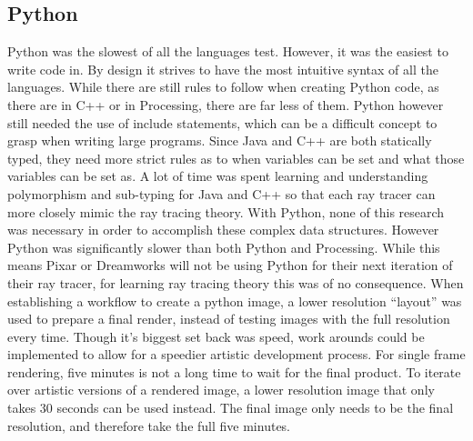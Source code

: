 \subsection{Python}
Python was the slowest of all the languages test.  However, it was the easiest to write code in.  By design it strives to have the most intuitive syntax of all the languages.  While there are still rules to follow when creating Python code, as there are in C++ or in Processing, there are far less of them.  Python however still needed the use of include statements, which can be a difficult concept to grasp when writing large programs. Since Java and C++ are both statically typed, they need more strict rules as to when variables can be set and what those variables can be set as.  A lot of time was spent learning and understanding polymorphism and sub-typing for Java and C++ so that each ray tracer can more closely mimic the ray tracing theory.  With Python, none of this research was necessary in order to accomplish these complex data structures.  However Python was significantly slower than both Python and Processing.  While this means Pixar or Dreamworks will not be using Python for their next iteration of their ray tracer, for learning ray tracing theory this was of no consequence.  When establishing a workflow to create a python image, a lower resolution ``layout'' was used to prepare a final render, instead of testing images with the full resolution every time.  Though it's biggest set back was speed, work arounds could be implemented to allow for a speedier artistic development process.  For single frame rendering, five minutes is not a long time to wait for the final product.  To iterate over artistic versions of a rendered image, a lower resolution image that only takes 30 seconds can be used instead.  The final image only needs to be the final resolution, and therefore take the full five minutes.

